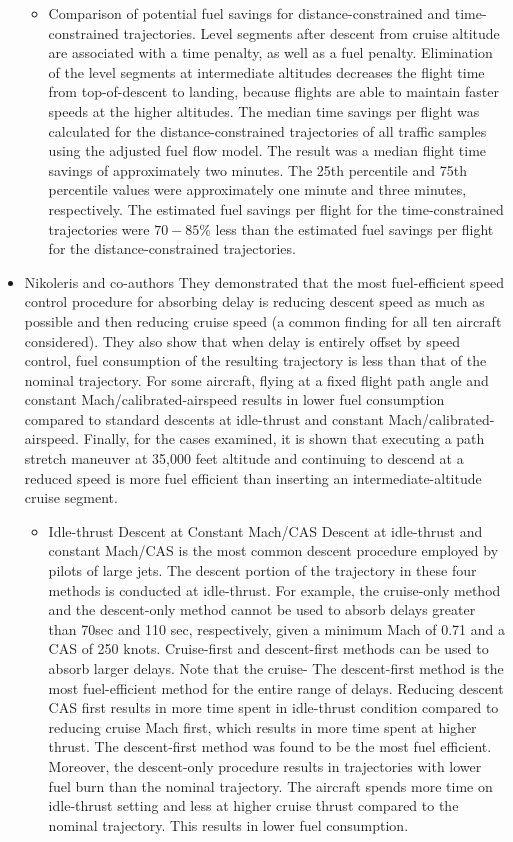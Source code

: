 \documentclass{aer1315-pretty}
\begin{document}
\begin{itemize}
\begin{itemize}
\item Comparison of potential fuel savings for distance-constrained and time-constrained trajectories. Level segments after descent from cruise altitude are associated with a time penalty, as well as a fuel penalty. Elimination of the level segments at intermediate altitudes decreases the flight time from top-of-descent to landing,
because flights are able to maintain faster speeds at the higher altitudes. The median time savings per flight was calculated for the distance-constrained trajectories of all traffic samples using the adjusted fuel flow model. The result was a median flight time savings of approximately two minutes. The 25th percentile and 75th percentile values were approximately one minute and three minutes, respectively. The estimated fuel savings per flight for the time-constrained trajectories were $70-85\%$ less than the estimated fuel savings per flight for the distance-constrained trajectories.
\end{itemize}


\item Nikoleris and co-authors \cite{Niko:2012} 
They demonstrated that the most fuel-efficient speed control procedure for absorbing delay is reducing descent speed as much as possible and then reducing cruise speed (a common finding for all ten aircraft considered). They also show that when delay is entirely offset by speed control, fuel consumption of the resulting trajectory is less than that of the nominal trajectory. For some aircraft, flying at a fixed flight path angle and constant Mach/calibrated-airspeed results in lower fuel consumption compared to standard descents at idle-thrust and constant Mach/calibrated-airspeed. Finally, for the cases examined, it is shown that executing a path stretch maneuver at 35,000 feet altitude and continuing to descend at a reduced speed is more fuel efficient than inserting an intermediate-altitude cruise segment.

\begin{itemize}
\item Idle-thrust Descent at Constant Mach/CAS
Descent at idle-thrust and constant Mach/CAS is the most common descent procedure employed by pilots of large jets.  The descent portion of the trajectory in these four methods is conducted at idle-thrust. For example, the cruise-only method and the descent-only method cannot be used to absorb delays greater than 70sec and 110 sec, respectively, given a minimum Mach of 0.71 and a CAS of 250 knots. Cruise-first and descent-first methods can be used to absorb larger delays. Note that the cruise-
The descent-first method is the most fuel-efficient method for the entire range of delays. Reducing descent CAS first results in more time spent in idle-thrust condition compared to reducing cruise Mach first, which results in more time spent at higher thrust. The descent-first method was found to be the most fuel efficient. Moreover, the descent-only procedure results in trajectories with lower fuel burn than the nominal trajectory. The aircraft spends more time on idle-thrust setting and less at higher cruise thrust compared to the nominal trajectory. This results in lower fuel consumption.


\end{itemize}
\end{itemize}
\end{document}
